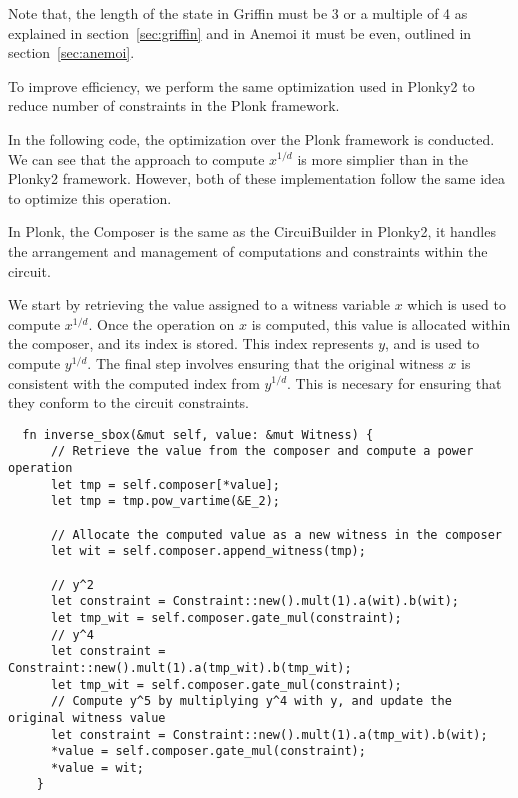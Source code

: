 Note that, the length of the state in Griffin must be 3 or a multiple of 4 as explained in section~\ref{sec:griffin} and in Anemoi it must be even, outlined in section~\ref{sec:anemoi}.

To improve efficiency, we perform the same optimization used in Plonky2 to reduce number of constraints in the Plonk framework.

In the following code, the optimization over the Plonk framework is conducted.\\
We can see that the approach to compute $x^{1/d}$ is more simplier than in the Plonky2 framework. However, both of these implementation follow the same idea to optimize this operation.

In Plonk, the Composer is the same as the CircuiBuilder in Plonky2, it handles the arrangement and management of computations and constraints within the circuit.

We start by retrieving the value assigned to a witness variable $x$ which is used to compute $x^{1/d}$. Once the operation on $x$ is computed, this value is allocated within the composer, and its index is stored. This index represents $y$, and is used to compute $y^{1/d}$. The final step involves ensuring that the original witness $x$ is consistent with the computed index from $y^{1/d}$. This is necesary for ensuring that they conform to the circuit constraints.
\vspace{1em}

\begin{lstlisting}
  fn inverse_sbox(&mut self, value: &mut Witness) {
      // Retrieve the value from the composer and compute a power operation
      let tmp = self.composer[*value];
      let tmp = tmp.pow_vartime(&E_2);

      // Allocate the computed value as a new witness in the composer
      let wit = self.composer.append_witness(tmp);

      // y^2
      let constraint = Constraint::new().mult(1).a(wit).b(wit);
      let tmp_wit = self.composer.gate_mul(constraint);
      // y^4
      let constraint = Constraint::new().mult(1).a(tmp_wit).b(tmp_wit);
      let tmp_wit = self.composer.gate_mul(constraint);
      // Compute y^5 by multiplying y^4 with y, and update the original witness value
      let constraint = Constraint::new().mult(1).a(tmp_wit).b(wit);
      *value = self.composer.gate_mul(constraint);
      *value = wit;
    }
\end{lstlisting}